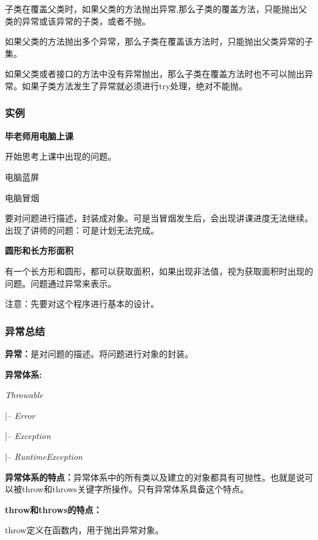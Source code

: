 \documentclass[UTF8]{ctexart}
\begin{document}
\textbullet 子类在覆盖父类时，如果父类的方法抛出异常,那么子类的覆盖方法，只能抛出父类的异常或该异常的子类，或者不抛。

\textbullet 如果父类的方法抛出多个异常，那么子类在覆盖该方法时，只能抛出父类异常的子集。

\textbullet 如果父类或者接口的方法中没有异常抛出，那么子类在覆盖方法时也不可以抛出异常。如果子类方法发生了异常就必须进行try处理，绝对不能抛。



\subsubsection{实例}
\textbf{毕老师用电脑上课}

开始思考上课中出现的问题。

\textbullet 电脑蓝屏

\textbullet 电脑冒烟

要对问题进行描述，封装成对象。可是当冒烟发生后，会出现讲课进度无法继续。出现了讲师的问题：可是计划无法完成。



\textbf{圆形和长方形面积}

有一个长方形和圆形，都可以获取面积，如果出现非法值，视为获取面积时出现的问题。问题通过异常来表示。

注意：先要对这个程序进行基本的设计。


\subsubsection{异常总结}

\textbf{异常：}是对问题的描述。将问题进行对象的封装。

\textbf{异常体系:}

\textit{Throwable}

\qquad |-- \textit{Error}

\qquad |-- \textit{Exception}

\qquad \qquad |-- \textit{RuntimeException}

\textbf{异常体系的特点：}异常体系中的所有类以及建立的对象都具有可抛性。也就是说可以被throw和throws关键字所操作。只有异常体系具备这个特点。

\textbf{throw和throws的特点：}

\textbullet throw定义在函数内，用于抛出异常对象。
\end{document}
